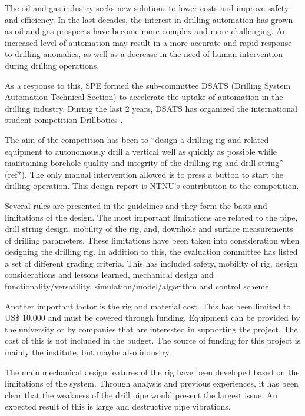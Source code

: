 The oil and gas industry seeks new solutions to lower costs and improve safety and efficiency. In the last decades, the interest in drilling automation has grown as oil and gas prospects have become more complex and more challenging. An increased level of automation may result in a more accurate and rapid response to drilling anomalies, as well as a decrease in the need of human intervention during drilling operations.

As a response to this, SPE formed the sub-committee DSATS (Drilling System Automation Technical Section) to accelerate the uptake of automation in the drilling industry. During the last 2 years, DSATS has organized the international student competition Drillbotics \texttrademark. 

The aim of the competition has been to “design a drilling rig and related equipment to autonomously drill a vertical well as quickly as possible while maintaining borehole quality and integrity of the drilling rig and drill string” (ref*). The only manual intervention allowed is to press a button to start the drilling operation. This design report is NTNU’s contribution to the competition.

Several rules are presented in the guidelines and they form the basis and limitations of the design. The most important limitations are related to the pipe, drill string design, mobility of the rig, and, downhole and surface measurements of drilling parameters. These limitations have been taken into consideration when designing the drilling rig. In addition to this, the evaluation committee has listed a set of different grading criteria. This has included safety, mobility of rig, design considerations and lessons learned, mechanical design and functionality/versatility, simulation/model/algorithm and control scheme. 

Another important factor is the rig and material cost. This has been limited to US\$ 10,000 and must be covered through funding. Equipment can be provided by the university or by companies that are interested in supporting the project. The cost of this is not included in the budget. The source of funding for this project is mainly the institute, but maybe also industry. 

The main mechanical design features of the rig have been developed based on the limitations of the system. Through analysis and previous experiences, it has been clear that the weakness of the drill pipe would present the largest issue. An expected result of this is large and destructive pipe vibrations. 

